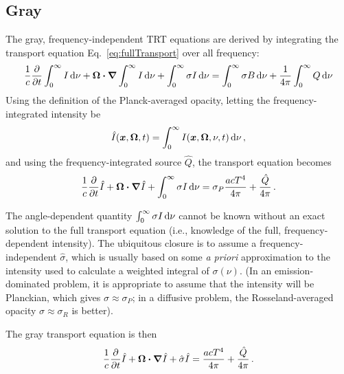 \documentclass[11pt]{SRJresearch}
\begin{document}
\subsection{Gray}
The gray, frequency-independent TRT equations are derived by integrating the
transport equation Eq.~\eqref{eq:fullTransport} over all frequency:
\begin{equation*}
  \frac{1}{c} \frac{\partial }{\partial t} \int_{0}^{\infty} I \mathop{}\!\mathrm{d} \nu
  + \bm{\Omega} \bm{\cdot} \bm{\nabla} \int_{0}^{\infty}  I \mathop{}\!\mathrm{d} \nu +
  \int_{0}^{\infty} \sigma I \mathop{}\!\mathrm{d} \nu
  = \int_{0}^{\infty}  \sigma B  \mathop{}\!\mathrm{d} \nu
  + \frac{1}{4\pi} \int_{0}^{\infty} Q \mathop{}\!\mathrm{d} \nu
\end{equation*}
Using the definition of the Planck-averaged opacity, letting the
frequency-integrated intensity be
\begin{equation*}
  \hat I(\bm{x}, \bm{\Omega}, t) = \int_{0}^{\infty}  I(\bm{x},
  \bm{\Omega}, \nu, t) \mathop{}\!\mathrm{d} \nu \,,
\end{equation*}
and using the frequency-integrated source $\hat Q$, the transport
equation becomes
\begin{equation} \label{eq:fullGrayTransport}
  \frac{1}{c} \frac{\partial }{\partial t} \hat I
  + \bm{\Omega} \bm{\cdot} \bm{\nabla} \hat I +
 \int_{0}^{\infty} \sigma I \mathop{}\!\mathrm{d} \nu
  = \sigma_P \frac{a c T^4}{4\pi} 
  + \frac{\hat Q}{4\pi} \,.
\end{equation}

The angle-dependent quantity $\int_{0}^{\infty} \sigma I \mathop{}\!\mathrm{d} \nu$ cannot be
known without an exact solution to the full transport equation (i.e.,
knowledge of the full, frequency-dependent intensity). The ubiquitous closure
is to
assume a frequency-independent $\hat \sigma$, which is usually based on some
\emph{a priori} approximation to the intensity used to calculate a weighted
integral of $\sigma(\nu)$. (In an emission-dominated problem, it is appropriate
to assume that the intensity will be Planckian, which gives $\hat \sigma
\approx \sigma_P$; in a diffusive problem, the Rosseland-averaged opacity $\hat
\sigma \approx \sigma_R$ is better).

The gray transport equation is then
\begin{equation} \label{eq:fullGrayTransport}
  \frac{1}{c} \frac{\partial }{\partial t} \hat I
  + \bm{\Omega} \bm{\cdot} \bm{\nabla} \hat I +
 \hat \sigma \hat I
  = \frac{a c T^4}{4\pi} 
  + \frac{\hat Q}{4\pi} \,.
\end{equation}
\end{document}
